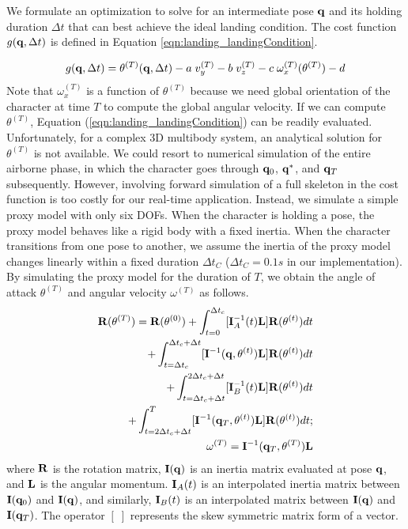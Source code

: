 We formulate an optimization to solve for an intermediate pose $\mathbf{q}$
and its holding duration $\Delta t$ that can best achieve the ideal
landing condition. The cost function  $g(\mathbf{q}, \Delta t)$ is defined
in Equation \ref{eqn:landing_landingCondition}.

\begin{equation}
g(\mathbf{q}, \Delta t) = \theta^{(T)}(\mathbf{q}, \Delta t) - a \;v_y^{(T)} - b \;v_z^{(T)} - c\;
\omega_x^{(T)}(\theta^{(T)}) - d
\label{eqn:landing_landingCondition}
\end{equation}
Note that $\omega_x^{(T)}$ is a function of $\theta^{(T)}$ because we
need global orientation of the character at time $T$ to compute the
global angular velocity. If we can compute $\theta^{(T)}$, Equation
(\ref{eqn:landing_landingCondition}) can be readily evaluated. Unfortunately,
for a complex 3D multibody system, an analytical solution for
$\theta^{(T)}$ is not available. We could resort to numerical
simulation of the entire airborne phase, in which the character goes
through $\mathbf{q}_0$, $\mathbf{q}^*$, and $\mathbf{q}_T$ subsequently. However,
involving forward simulation of a full skeleton in the cost function
is too costly for our real-time application. Instead, we simulate a simple proxy model
with only six DOFs. When the character is holding a pose, the proxy
model behaves like a rigid body with a fixed inertia.  When the
character transitions from one pose to another, we assume the inertia
of the proxy model changes linearly within a fixed duration $\Delta
t_C$ ($\Delta t_C = 0.1s$ in our implementation). By simulating the proxy
model for the duration of $T$, we obtain the angle of attack
$\theta^{(T)}$ and angular velocity $\omega^{(T)}$ as
follows.
\begin{eqnarray}
\mathbf{R}(\theta^{(T)}) = \mathbf{R}(\theta^{(0)}) + \int_{t=0}^{\Delta t_c}
[\mathbf{I}^{-1}_{A}(t)\mathbf{L}]\mathbf{R}(\theta^{(t)}) dt \nonumber \\ 
+ \int_{t=\Delta t_c}^{\Delta t_c + \Delta
  t}[\mathbf{I}^{-1}(\mathbf{q},\theta^{(t)})\mathbf{L}]\mathbf{R}(\theta^{(t)}) dt \nonumber \\ + \int_{t=\Delta
  t_c+\Delta t}^{2 \Delta t_c + \Delta t}
[\mathbf{I}^{-1}_{B}(t)\mathbf{L}]\mathbf{R}(\theta^{(t)}) dt \nonumber \\ +
\int_{t=2 \Delta t_c+\Delta t}^T
[\mathbf{I}^{-1}(\mathbf{q}_T,\theta^{(t)})\mathbf{L}]\mathbf{R}(\theta^{(t)}) dt; \\
\omega^{(T)} = \mathbf{I}^{-1}(\mathbf{q}_T,\theta^{(T)})\mathbf{L}
\end{eqnarray}
where $\mathbf{R}$ is the rotation matrix, $\mathbf{I}(\mathbf{q})$ is an inertia
matrix evaluated at pose $\mathbf{q}$, and $\mathbf{L}$ is the angular
momentum. $\mathbf{I}_{A}(t)$ is an interpolated inertia matrix between $\mathbf{I}(\mathbf{q}_0)$ and
$\mathbf{I}(\mathbf{q})$, and similarly, $\mathbf{I}_{B}(t)$ is an interpolated matrix between
$\mathbf{I}(\mathbf{q})$ and $\mathbf{I}(\mathbf{q}_T)$. The operator $[\;]$ represents the skew
symmetric matrix form of a vector.

